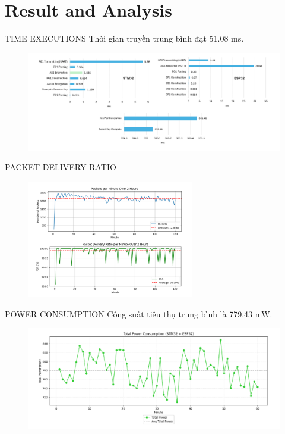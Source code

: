 \section{Result and Analysis}
\begin{frame}{TIME EXECUTIONS}
	Thời gian truyền trung bình đạt 51.08 ms.
	\vspace{-0.2cm}
	\begin{figure}
		\centering
		\hspace*{-1.2cm} 
		\includegraphics[width=1.2\textwidth]{pic/res_time.pdf}
	\end{figure}
\end{frame}

\begin{frame}{PACKET DELIVERY RATIO}
	\vspace{-0.25cm}
	\begin{figure}
		\centering
		\includegraphics[width=0.65\textwidth]{pic/pdr.pdf}
	\end{figure}
\end{frame}

\begin{frame}{POWER CONSUMPTION}
	Công suất tiêu thụ trung bình là 779.43 mW.
	\vspace{-0.2cm}
	\begin{figure}
		\centering
		\includegraphics[width=1\textwidth]{pic/power.pdf}
	\end{figure}
\end{frame}

